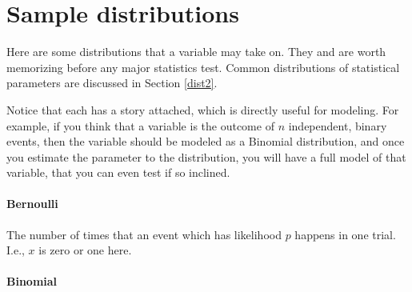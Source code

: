 
\section{Sample distributions}
\label{distlist}


Here are some distributions that a variable may take on. They and are
worth memorizing before any major statistics test. Common distributions
of statistical parameters are discussed in Section \ref{dist2}.

Notice that each has a story attached, which is directly useful for
modeling. For example, if you think that a variable is the outcome of $n$
independent, binary events, then the variable should be modeled as a
Binomial distribution, and once you estimate the parameter to the
distribution, you will have a full model of that variable, that you can
even test if so inclined.

\paragraph{Bernoulli}

The number of times that an event which has likelihood $p$ happens in
one trial. I.e., $x$ is zero or one here.


\paragraph{Binomial}

